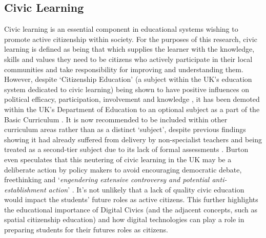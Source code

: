 \subsection{Civic Learning}
Civic learning is an essential component in educational systems wishing to promote active citizenship within society. For the purposes of this research, civic learning is defined as being that which supplies the learner with the knowledge, skills and values they need to be citizens who actively participate in their local communities and take responsibility for improving and understanding them. However, despite `Citizenship Education’ (a subject within the UK’s education system dedicated to civic learning) being shown to have positive influences on political efficacy, participation, involvement and knowledge \citep{whiteley2012}, it has been demoted within the UK’s Department of Education to an optional subject as a part of the Basic Curriculum \citep{GovEducation2011}. It is now recommended to be included within other curriculum areas rather than as a distinct `subject’, despite previous findings showing it had already suffered from delivery by non-specialist teachers and being treated as a second-tier subject due to its lack of formal assessments \citep{Burton2015, Ofsted2013}. Burton even speculates that this neutering of civic learning in the UK may be a deliberate action by policy makers to avoid encouraging democratic debate, freethinking and ‘\textit{engendering extensive controversy and potential anti-establishment action}’ \citep{Burton2015}. It's not unlikely that a lack of quality civic education would impact the students' future roles as active citizens. This further highlights the educational importance of Digital Civics (and the adjacent concepts, such as spatial citizenship education) and how digital technologies can play a role in preparing students for their futures roles as citizens.

